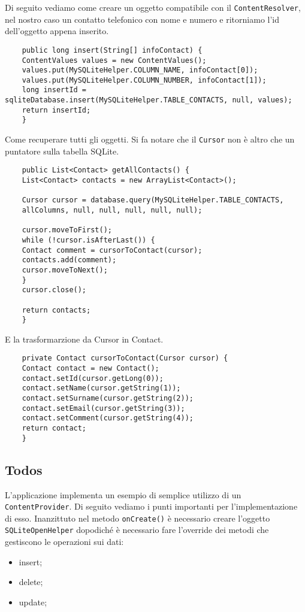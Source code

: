 \begin{itemize}
	Di seguito vediamo come creare un oggetto compatibile con il \lstinline|ContentResolver|, nel nostro caso un contatto telefonico con nome e numero e ritorniamo l'id dell'oggetto appena inserito.
	\begin{lstlisting}
	public long insert(String[] infoContact) {
	ContentValues values = new ContentValues();
	values.put(MySQLiteHelper.COLUMN_NAME, infoContact[0]);
	values.put(MySQLiteHelper.COLUMN_NUMBER, infoContact[1]);
	long insertId = sqliteDatabase.insert(MySQLiteHelper.TABLE_CONTACTS, null, values);
	return insertId;
	}
	\end{lstlisting}
	
	Come recuperare tutti gli oggetti. Si fa notare che il \lstinline|Cursor| non è altro che un puntatore sulla tabella SQLite.
	\begin{lstlisting}
	public List<Contact> getAllContacts() {
	List<Contact> contacts = new ArrayList<Contact>();
	
	Cursor cursor = database.query(MySQLiteHelper.TABLE_CONTACTS,
	allColumns, null, null, null, null, null);
	
	cursor.moveToFirst();
	while (!cursor.isAfterLast()) {
	Contact comment = cursorToContact(cursor);
	contacts.add(comment);
	cursor.moveToNext();
	}
	cursor.close();
	
	return contacts;
	}
	\end{lstlisting}
	
	E la trasformarzione da Cursor in Contact.
	\begin{lstlisting}
	private Contact cursorToContact(Cursor cursor) {
	Contact contact = new Contact();
	contact.setId(cursor.getLong(0));
	contact.setName(cursor.getString(1));
	contact.setSurname(cursor.getString(2));
	contact.setEmail(cursor.getString(3));
	contact.setComment(cursor.getString(4));
	return contact;
	}
	\end{lstlisting}
	
	
	\subsection{Todos}
	L'applicazione implementa un esempio di semplice utilizzo di un \lstinline|ContentProvider|. Di seguito vediamo i punti importanti per l'implementazione di esso. Inanzittuto nel metodo \lstinline|onCreate()| è necessario creare l'oggetto \lstinline|SQLiteOpenHelper| dopodiché è necessario fare l'override dei metodi che gestiscono le operazioni sui dati:
	\begin{itemize}
		\item insert;
		\item delete;
		\item update;
	\end{itemize}
	

\end{itemize}
